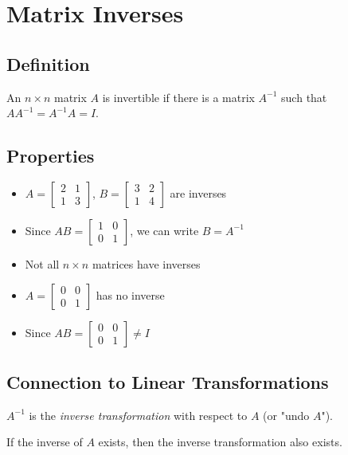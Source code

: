 \documentclass[12pt,a4paper]{article}
\begin{document}
\section{Matrix Inverses}

\subsection{Definition}

An $n \times n$ matrix $A$ is invertible if there is a matrix $A^{-1}$ such that $AA^{-1} = A^{-1}A = I$.

\subsection{Properties}

\begin{itemize}
    \item $A = \begin{bmatrix} 2 & 1 \\ 1 & 3 \end{bmatrix}$, $B = \begin{bmatrix} 3 & 2 \\ 1 & 4 \end{bmatrix}$ are inverses
    \item Since $AB = \begin{bmatrix} 1 & 0 \\ 0 & 1 \end{bmatrix}$, we can write $B = A^{-1}$
    \item Not all $n \times n$ matrices have inverses
    \item $A = \begin{bmatrix} 0 & 0 \\ 0 & 1 \end{bmatrix}$ has no inverse
    \item Since $AB = \begin{bmatrix} 0 & 0 \\ 0 & 1 \end{bmatrix} \neq I$
\end{itemize}

\subsection{Connection to Linear Transformations}

$A^{-1}$ is the \textit{inverse transformation} with respect to $A$ (or "undo $A$").

If the inverse of $A$ exists, then the inverse transformation also exists.
\end{document}

